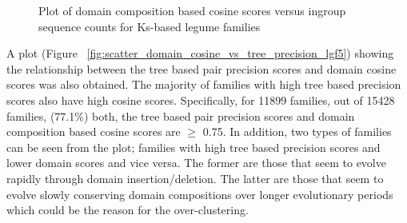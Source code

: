 \documentclass{article}
\begin{document}
		\begin{figure}
			\caption{Plot of domain composition based cosine scores versus ingroup sequence counts for Ks-based legume families}
			\label{fig:scatter_domain_cosine_vs_seq_ct_lgf5}
		\end{figure}
		
		A plot (Figure ~\ref{fig:scatter_domain_cosine_vs_tree_precision_lgf5}) showing the relationship between the tree based pair precision scores and domain cosine scores was also obtained. The majority of families with high tree based precision scores also have high cosine scores. Specifically, for 11899 families, out of 15428 families, (77.1\%) both, the tree based pair precision scores and domain composition based cosine scores are $\geq$ 0.75.  In addition, two types of families can be seen from the plot; families with high tree based precision scores and lower domain scores and vice versa. The former are those that seem to evolve rapidly through domain insertion/deletion. The latter are those that seem to evolve slowly conserving domain compositions over longer evolutionary periods which could be the reason for the over-clustering.
		
\end{document}
